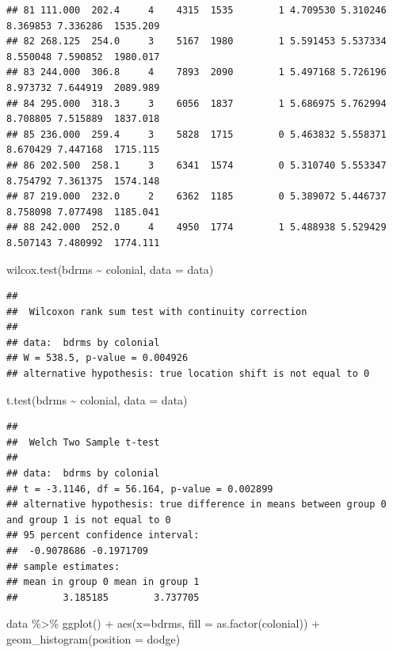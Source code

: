 \documentclass[
]{book}
\newenvironment{Shaded}{\begin{snugshade}}{\end{snugshade}}
\newcommand{\AttributeTok}[1]{\textcolor[rgb]{0.77,0.63,0.00}{#1}}
\newcommand{\FunctionTok}[1]{\textcolor[rgb]{0.00,0.00,0.00}{#1}}
\newcommand{\NormalTok}[1]{#1}
\newcommand{\SpecialCharTok}[1]{\textcolor[rgb]{0.00,0.00,0.00}{#1}}
\newcommand{\StringTok}[1]{\textcolor[rgb]{0.31,0.60,0.02}{#1}}
\theoremstyle{definition}
\theoremstyle{definition}
\theoremstyle{definition}
\theoremstyle{definition}
\theoremstyle{remark}
\begin{document}
\begin{verbatim}
## 81 111.000  202.4     4    4315  1535        1 4.709530 5.310246  8.369853 7.336286  1535.209
## 82 268.125  254.0     3    5167  1980        1 5.591453 5.537334  8.550048 7.590852  1980.017
## 83 244.000  306.8     4    7893  2090        1 5.497168 5.726196  8.973732 7.644919  2089.989
## 84 295.000  318.3     3    6056  1837        1 5.686975 5.762994  8.708805 7.515889  1837.018
## 85 236.000  259.4     3    5828  1715        0 5.463832 5.558371  8.670429 7.447168  1715.115
## 86 202.500  258.1     3    6341  1574        0 5.310740 5.553347  8.754792 7.361375  1574.148
## 87 219.000  232.0     2    6362  1185        0 5.389072 5.446737  8.758098 7.077498  1185.041
## 88 242.000  252.0     4    4950  1774        1 5.488938 5.529429  8.507143 7.480992  1774.111
\end{verbatim}

\begin{Shaded}
\begin{Highlighting}[]
\FunctionTok{wilcox.test}\NormalTok{(bdrms }\SpecialCharTok{\textasciitilde{}}\NormalTok{ colonial, }\AttributeTok{data =}\NormalTok{ data)}
\end{Highlighting}
\end{Shaded}

\begin{verbatim}
## 
##  Wilcoxon rank sum test with continuity correction
## 
## data:  bdrms by colonial
## W = 538.5, p-value = 0.004926
## alternative hypothesis: true location shift is not equal to 0
\end{verbatim}

\begin{Shaded}
\begin{Highlighting}[]
\FunctionTok{t.test}\NormalTok{(bdrms }\SpecialCharTok{\textasciitilde{}}\NormalTok{ colonial, }\AttributeTok{data =}\NormalTok{ data)}
\end{Highlighting}
\end{Shaded}

\begin{verbatim}
## 
##  Welch Two Sample t-test
## 
## data:  bdrms by colonial
## t = -3.1146, df = 56.164, p-value = 0.002899
## alternative hypothesis: true difference in means between group 0 and group 1 is not equal to 0
## 95 percent confidence interval:
##  -0.9078686 -0.1971709
## sample estimates:
## mean in group 0 mean in group 1 
##        3.185185        3.737705
\end{verbatim}

\begin{Shaded}
\begin{Highlighting}[]
\NormalTok{data }\SpecialCharTok{\%\textgreater{}\%} 
  \FunctionTok{ggplot}\NormalTok{() }\SpecialCharTok{+} 
  \FunctionTok{aes}\NormalTok{(}\AttributeTok{x=}\NormalTok{bdrms, }\AttributeTok{fill =} \FunctionTok{as.factor}\NormalTok{(colonial)) }\SpecialCharTok{+} 
  \FunctionTok{geom\_histogram}\NormalTok{(}\AttributeTok{position =} \StringTok{\textquotesingle{}dodge\textquotesingle{}}\NormalTok{)}
\end{Highlighting}
\end{Shaded}
\end{document}
